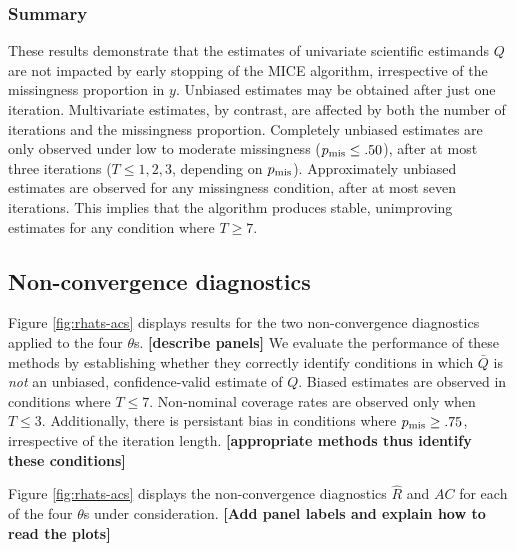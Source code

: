 \documentclass[Royal,times,sageh]{sagej}
\begin{document}
\hypertarget{summary}{%
\subsubsection{Summary}\label{summary}}

These results demonstrate that the estimates of univariate scientific estimands \(Q\) are not impacted by early stopping of the MICE algorithm, irrespective of the missingness proportion in \(y\). Unbiased estimates may be obtained after just one iteration. Multivariate estimates, by contrast, are affected by both the number of iterations and the missingness proportion. Completely unbiased estimates are only observed under low to moderate missingness (\(p_{\rm mis}\leq.50\)), after at most three iterations (\(T\leq1,2,3\), depending on \(p_{\rm mis}\)). Approximately unbiased estimates are observed for any missingness condition, after at most seven iterations. This implies that the algorithm produces stable, unimproving estimates for any condition where \(T\geq7\).

\hypertarget{non-convergence-diagnostics-1}{%
\subsection{Non-convergence diagnostics}\label{non-convergence-diagnostics-1}}

Figure \ref{fig:rhats-acs} displays results for the two non-convergence diagnostics applied to the four \(\theta\)s. \textbf{{[}describe panels{]}} We evaluate the performance of these methods by establishing whether they correctly identify conditions in which \(\bar{Q}\) is \emph{not} an unbiased, confidence-valid estimate of \(Q\). Biased estimates are observed in conditions where \(T\leq7\). Non-nominal coverage rates are observed only when \(T\leq3\). Additionally, there is persistant bias in conditions where \(p_{\rm mis}\geq.75\), irrespective of the iteration length. \textbf{{[}appropriate methods thus identify these conditions{]}}

Figure \ref{fig:rhats-acs} displays the non-convergence diagnostics \(\widehat{R}\) and \(AC\) for each of the four \(\theta\)s under consideration. \textbf{{[}Add panel labels and explain how to read the plots{]}}
\end{document}
